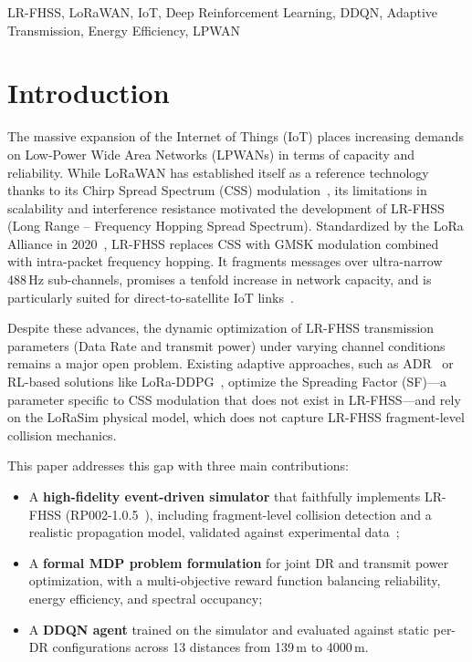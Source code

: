 \documentclass[conference]{IEEEtran}
\begin{document}
	\begin{IEEEkeywords}
		LR-FHSS, LoRaWAN, IoT, Deep Reinforcement Learning, DDQN, Adaptive
		Transmission, Energy Efficiency, LPWAN
	\end{IEEEkeywords}
	
	\section{Introduction}
	
	The massive expansion of the Internet of Things (IoT) places increasing demands
	on Low-Power Wide Area Networks (LPWANs) in terms of capacity and reliability.
	While LoRaWAN has established itself as a reference technology thanks to its
	Chirp Spread Spectrum (CSS) modulation~\cite{Raza2017LPWANSurvey}, its
	limitations in scalability and interference resistance motivated the development
	of LR-FHSS (Long Range -- Frequency Hopping Spread Spectrum). Standardized by
	the LoRa Alliance in 2020~\cite{loraalliance2020regional}, LR-FHSS replaces
	CSS with GMSK modulation combined with intra-packet frequency hopping. It
	fragments messages over ultra-narrow 488\,Hz sub-channels, promises a tenfold
	increase in network capacity, and is particularly suited for direct-to-satellite
	IoT links~\cite{ieee_lr_fhss_2021}.
	
	Despite these advances, the dynamic optimization of LR-FHSS transmission
	parameters (Data Rate and transmit power) under varying channel conditions
	remains a major open problem. Existing adaptive approaches, such as
	ADR~\cite{Li2018ADRanalysis} or RL-based solutions like
	LoRa-DDPG~\cite{greenlora,greenlora2024}, optimize the Spreading Factor
	(SF)---a parameter specific to CSS modulation that does not exist in
	LR-FHSS---and rely on the LoRaSim physical model, which does not capture
	LR-FHSS fragment-level collision mechanics.
	
	This paper addresses this gap with three main contributions:
	\begin{itemize}
		\item A \textbf{high-fidelity event-driven simulator} that faithfully
		implements LR-FHSS (RP002-1.0.5~\cite{loraalliance2025regional}), including
		fragment-level collision detection and a realistic propagation model,
		validated against experimental data~\cite{lrfhss_comparaison};
		\item A \textbf{formal MDP problem formulation} for joint DR and transmit
		power optimization, with a multi-objective reward function balancing
		reliability, energy efficiency, and spectral occupancy;
		\item A \textbf{DDQN agent} trained on the simulator and evaluated against
		static per-DR configurations across 13 distances from 139\,m to 4000\,m.
	\end{itemize}
	
\end{document}
